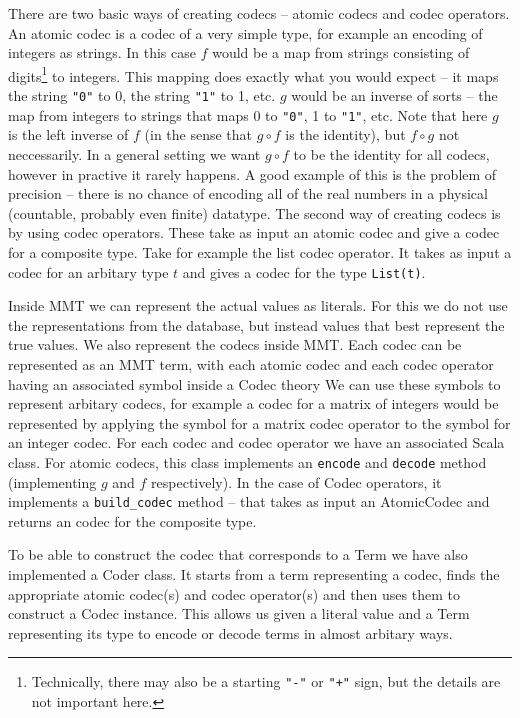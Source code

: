 \documentclass{deliverablereport}
\begin{document}
There are two basic ways of creating codecs -- atomic codecs and codec operators. An atomic codec is a codec of a very simple type, for example an encoding of integers as strings. In this case $f$ would be a map from strings consisting of digits\footnote{Technically, there may also be a starting \texttt{"-"} or \texttt{"+"} sign, but the details are not important here. } to integers. This mapping does exactly what you would expect -- it maps the string \texttt{"0"} to 0, the string \texttt{"1"} to 1, etc. $g$ would be an inverse of sorts -- the map from integers to strings that maps 0 to \texttt{"0"}, 1 to \texttt{"1"}, etc. Note that here $g$ is the left inverse of $f$ (in the sense that $g \circ f$ is the identity), but $f \circ g$ not neccessarily. In a general setting we want $g \circ f$ to be the identity for all codecs, however in practive it rarely happens. A good example of this is the problem of precision -- there is no chance of encoding all of the real numbers in a physical (countable, probably even finite) datatype.
The second way of creating codecs is by using codec operators. These take as input an atomic codec and give a codec for a composite type. Take for example the list codec operator. It takes as input a codec for an arbitary type $t$ and gives a codec for the type \texttt{List(t)}.

Inside MMT we can represent the actual values as literals. For this we do not use the representations from the database, but instead values that best represent the true values. We also represent the codecs inside MMT. Each codec can be represented as an MMT term, with each atomic codec  and each codec operator having an associated symbol inside a Codec theory We can use these symbols to represent arbitary codecs, for example a codec for a matrix of integers would be represented by applying the symbol for a matrix codec operator to the symbol for an integer codec. For each codec and codec operator we have an associated Scala class. For atomic codecs, this class implements an \texttt{encode} and \texttt{decode} method (implementing $g$ and $f$ respectively). In the case of Codec operators, it implements a \texttt{build\_codec} method -- that takes as input an AtomicCodec and returns an codec for the composite type.

To be able to construct the codec that corresponds to a Term we have also implemented a Coder class. It starts from a term representing a codec, finds the appropriate atomic codec(s) and codec operator(s) and then uses them to construct a Codec instance. This allows us given a literal value  and a Term representing its type to encode or decode terms in almost arbitary ways.
\end{document}
